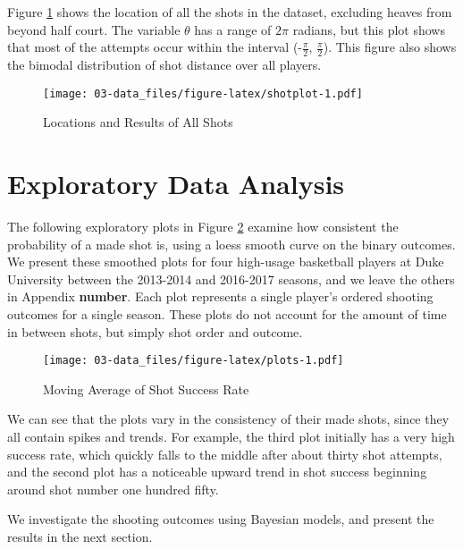 \documentclass[12pt,twoside]{dukestatscithesis}
\theoremstyle{definition}
\theoremstyle{definition}
\theoremstyle{definition}
\theoremstyle{remark}
\begin{document}
Figure \ref{fig:shotplot} shows the location of all the shots in the
dataset, excluding heaves from beyond half court. The variable
\(\theta\) has a range of \(2\pi\) radians, but this plot shows that
most of the attempts occur within the interval (-\(\frac{\pi}{2}\),
\(\frac{\pi}{2}\)). This figure also shows the bimodal distribution of
shot distance over all players.
\begin{figure}[htbp]
\centering
\texttt{[image: 03-data\_files/figure-latex/shotplot-1.pdf]}
\caption{\label{fig:shotplot}Locations and Results of All Shots}
\end{figure}
\section{Exploratory Data Analysis}\label{exploratory-data-analysis}

The following exploratory plots in Figure \ref{fig:plots} examine how
consistent the probability of a made shot is, using a loess smooth curve
on the binary outcomes. We present these smoothed plots for four
high-usage basketball players at Duke University between the 2013-2014
and 2016-2017 seasons, and we leave the others in Appendix
\textbf{number}. Each plot represents a single player's ordered shooting
outcomes for a single season. These plots do not account for the amount
of time in between shots, but simply shot order and outcome.
\begin{figure}[htbp]
\centering
\texttt{[image: 03-data\_files/figure-latex/plots-1.pdf]}
\caption{\label{fig:plots}Moving Average of Shot Success Rate}
\end{figure}
We can see that the plots vary in the consistency of their made shots,
since they all contain spikes and trends. For example, the third plot
initially has a very high success rate, which quickly falls to the
middle after about thirty shot attempts, and the second plot has a
noticeable upward trend in shot success beginning around shot number one
hundred fifty.

We investigate the shooting outcomes using Bayesian models, and present
the results in the next section.


\end{document}
